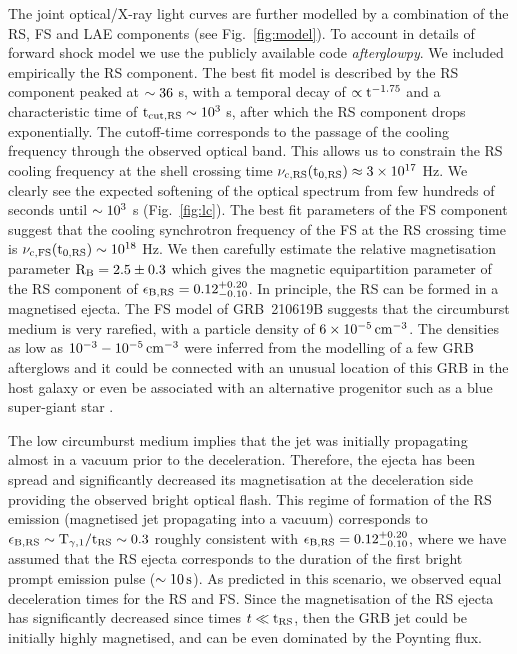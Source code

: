 \documentclass{naturesubmissionstyle}
\begin{document}
The joint optical/X-ray light curves are further modelled by a combination of the RS, FS and LAE components (see Fig.~\ref{fig:model}). To account in  
details of forward shock model we use the publicly available code {\it afterglowpy}\cite{Ryan2020}. 
We included empirically the RS component.
The best fit model is described by the RS component peaked at $\rm \sim 36$ s, with a temporal decay of $\rm \propto t^{-1.75}$ and a
characteristic time of $\rm t_{cut,RS} \sim 10^{3}$ s, after which 
the RS component drops exponentially. The cutoff-time corresponds to the passage of the cooling frequency through the observed optical band. This allows us to constrain the RS cooling frequency\cite{Kobayashi2000} at the shell crossing time $\rm \nu_{c,RS}(t_{0,RS}) \approx 3 \times 10^{17}$ Hz. We clearly see the expected softening of the optical spectrum from few hundreds of seconds until $\rm \sim 10^{3}$ s (Fig.~\ref{fig:lc}). The best fit parameters of the FS component suggest that the cooling synchrotron frequency of the FS at the RS crossing time is $\rm \nu_{c,FS}(t_{0,RS}) \sim 10^{18}$ Hz. We then 
carefully estimate the relative magnetisation parameter\cite{Zhang2003,Kobayashi2003} $\rm R_{B} = 2.5 \pm 0.3$ which gives the magnetic equipartition parameter of the RS component of $\rm \epsilon_{B,RS} = 0.12_{-0.10}^{+0.20}$. In principle, the RS can be formed in a magnetised ejecta\cite{Zhang2005,Giannios2008,Mizuno2009}. The FS model of GRB~210619B suggests that the circumburst medium is very rarefied, with a particle density of $\rm 6 \times 10^{-5} \, cm^{-3}$. The densities as low as $\rm 10^{-3}-10^{-5} \, cm^{-3}$ were inferred from the modelling of a few GRB afterglows\cite{Evans2014,Laskar2014,Laskar2015,Laskar2016,Alexander2017} and it could be connected with an unusual location of this GRB in the host galaxy or even be associated with an alternative progenitor such as a blue super-giant star \cite{Piro2014}. 

The low circumburst medium implies that the jet was initially propagating almost in a vacuum prior to the deceleration. Therefore, the ejecta has been spread and significantly decreased its magnetisation at the deceleration side providing the observed bright optical flash\cite{Granot2012}. This regime of formation of the RS emission (magnetised jet propagating into a vacuum\cite{Granot2012}) corresponds to $\rm  \epsilon_{B,RS} \sim T_{\gamma,1}/t_{RS} \sim 0.3$ roughly consistent with $\rm \epsilon_{B,RS} = 0.12_{-0.10}^{+0.20}$, where we have assumed that the RS ejecta corresponds to the duration of the first bright prompt emission pulse ($\rm \sim 10 \, s$). 
As predicted in this scenario, we observed equal deceleration times for the RS and FS.
Since the magnetisation of the RS ejecta has significantly decreased since times $t\rm \ll t_{RS}$\cite{Granot2012}, then 
the GRB jet could be initially highly magnetised, and can be even dominated by the Poynting flux\cite{Usov1992,Thompson1994,Meszaros1997b}. 
\end{document}
